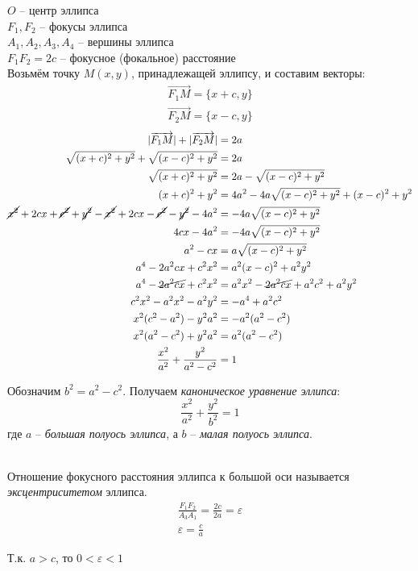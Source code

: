 $O$ -- центр эллипса \\
 $F_1, F_2$ -- фокусы эллипса \\
 $A_1, A_2, A_3, A_4$ -- вершины эллипса \\
$F_1F_2 = 2c$  -- фокусное (фокальное) расстояние\\
Возьмём точку $M(x, y)$, принадлежащей эллипсу, и составим векторы:
\begin{gather*}
  \overrightarrow{F_1M} = \{x + c, y\} \\
  \overrightarrow{F_2M} = \{x - c, y\}
\end{gather*}
\begin{align*}
  |\overrightarrow{F_1M}| + |\overrightarrow{F_2M}| &= 2a \\
  \sqrt{(x + c)^2 + y^2} + \sqrt{(x - c)^2 + y^2} &= 2a \\
  \sqrt{(x + c)^2 + y^2} &= 2a - \sqrt{(x - c)^2 + y^2} \\
  (x + c)^2 + y^2 &= 4a^2 - 4a\sqrt{(x - c)^2 + y^2} + (x - c)^2 +y^2 \\
  \cancel{x^2} + 2cx + \cancel{c^2} + \cancel{y^2} - \cancel{x^2} + 2cx - \cancel{c^2} - \cancel{y^2} - 4a^2 &= -4a\sqrt{(x - c)^2 + y^2} \\
  4cx - 4a^2 &= -4a\sqrt{(x - c)^2 + y^2} \\
  a^2 - cx &= a\sqrt{(x - c)^2 + y^2} \\
  a^4 - 2a^2cx + c^2x^2 &= a^2(x - c)^2 + a^2y^2 \\
  a^4 - \cancel{2a^2cx} + c^2x^2 &= a^2x^2 - \cancel{2a^2cx} + a^2c^2 + a^2y^2 \\
  c^2x^2 - a^2x^2 - a^2y^2 &= - a^4 + a^2c^2 \\
  x^2(c^2 - a^2) - y^2a^2 &= -a^2(a^2 - c^2) \\
  x^2(a^2 - c^2) + y^2a^2 &= a^2(a^2 - c^2) \\
  \frac{x^2}{a^2} + \frac{y^2}{a^2 - c^2} &= 1
\end{align*} 

Обозначим $b^2 = a^2 - c^2$. Получаем \textit{каноническое уравнение эллипса}: \[
  \boxed{\frac{x^2}{a^2} + \frac{y^2}{b^2} = 1}
\]  
где $a$ -- \textit{большая полуось эллипса}, а  $b$ -- \textit{малая полуось эллипса}.


\\
Отношение фокусного расстояния эллипса к большой оси называется \textit{эксцентриситетом} эллипса.
\begin{gather*}
  \frac{F_1F_2}{A_3A_1} = \frac{2c}{2a} = \varepsilon \\
  \boxed{\varepsilon = \frac{c}{a}}
\end{gather*}
\begin{note}
  Т.к. $a > c$, то $0 < \varepsilon < 1$
\end{note}

